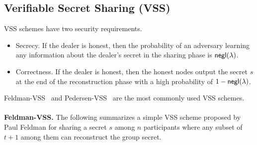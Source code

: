 

\subsection{Verifiable Secret Sharing (VSS)}
\label{appendix:vss}

VSS schemes have two security requirements.
\begin{itemize}
    \item Secrecy. If the dealer is honest, then the probability of an adversary learning
    any information about the dealer's secret in the sharing phase is $\mathsf{negl}(\lambda)$.
    \item Correctness. If the dealer is honest, then the honest nodes output the secret
    $s$ at the end of the reconstruction phase with a high probability of $1 - \mathsf{negl}(\lambda)$.
\end{itemize}
Feldman-VSS~\cite{feldman1987practical} and Pedersen-VSS~\cite{pedersen1991non} are the most commonly used VSS schemes.\\\\
\noindent\textbf{Feldman-VSS.}
\label{appendix:feldmanVSS}
The following summarizes a simple VSS scheme proposed by Paul Feldman for sharing a secret $s$ among $n$ participants where any subset of $t + 1$ among them can reconstruct the group secret.

